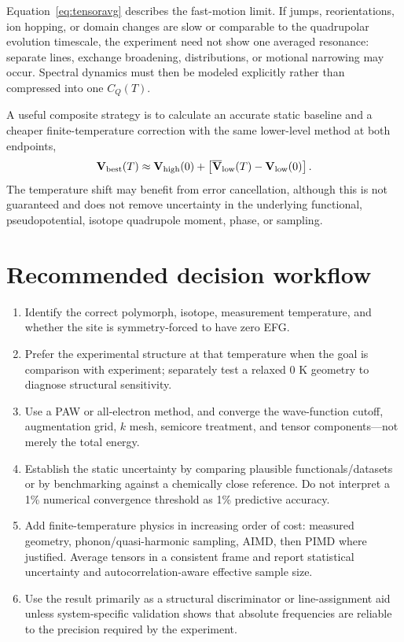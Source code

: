 \documentclass[10pt]{article}
\newcommand{\V}{\mathbf{V}}
\begin{document}
Equation~\eqref{eq:tensoravg} describes the fast-motion limit.  If jumps, reorientations, ion hopping, or domain changes are slow or comparable to the quadrupolar evolution timescale, the experiment need not show one averaged resonance: separate lines, exchange broadening, distributions, or motional narrowing may occur.  Spectral dynamics must then be modeled explicitly rather than compressed into one $C_Q(T)$.

A useful composite strategy is to calculate an accurate static baseline and a cheaper finite-temperature correction with the same lower-level method at both endpoints,
\begin{equation}
 \V_{\rm best}(T)\approx \V_{\rm high}(0)+
 \left[\overline{\V}_{\rm low}(T)-\V_{\rm low}(0)\right].
 \label{eq:delta}
\end{equation}
The temperature shift may benefit from error cancellation, although this is not guaranteed and does not remove uncertainty in the underlying functional, pseudopotential, isotope quadrupole moment, phase, or sampling.

\section{Recommended decision workflow}

\begin{enumerate}
 \item Identify the correct polymorph, isotope, measurement temperature, and whether the site is symmetry-forced to have zero EFG.
 \item Prefer the experimental structure at that temperature when the goal is comparison with experiment; separately test a relaxed 0 K geometry to diagnose structural sensitivity.
 \item Use a PAW or all-electron method, and converge the wave-function cutoff, augmentation grid, $k$ mesh, semicore treatment, and tensor components---not merely the total energy.
 \item Establish the static uncertainty by comparing plausible functionals/datasets or by benchmarking against a chemically close reference.  Do not interpret a 1\% numerical convergence threshold as 1\% predictive accuracy.
 \item Add finite-temperature physics in increasing order of cost: measured geometry, phonon/quasi-harmonic sampling, AIMD, then PIMD where justified.  Average tensors in a consistent frame and report statistical uncertainty and autocorrelation-aware effective sample size.
 \item Use the result primarily as a structural discriminator or line-assignment aid unless system-specific validation shows that absolute frequencies are reliable to the precision required by the experiment.
\end{enumerate}
\end{document}
